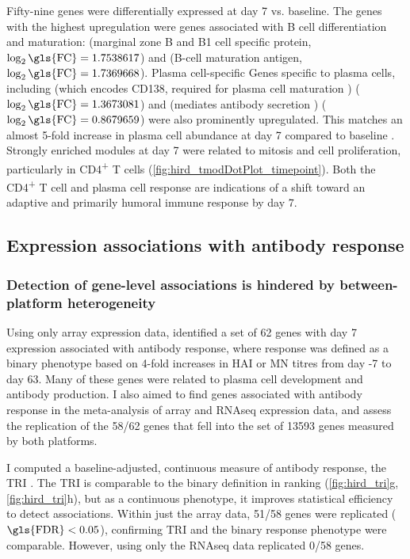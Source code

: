 Fifty-nine genes were differentially expressed at day 7 vs. baseline.
The genes with the highest upregulation were genes associated with B cell differentiation and maturation:  (marginal zone B and B1 cell specific protein, $\log_2\text{\gls{FC}} = 1.7538617$) and  (B-cell maturation antigen, $\log_2\text{\gls{FC}} = 1.7369668$).
Plasma cell-specific 
Genes specific to plasma cells, including  (which encodes CD138, required for plasma cell maturation \autocite{mccarron2017CD138MediatesSelection}) ($\log_2\text{\gls{FC}} = 1.3673081$) and  (mediates antibody secretion \autocite{martincic2009TranscriptionElongationFactor}) ($\log_2\text{\gls{FC}} = 0.8679659$) were also prominently upregulated.
This matches an almost 5-fold increase in plasma cell abundance at day 7 compared to baseline \autocite{sobolev2016AdjuvantedInfluenzaH1N1Vaccination}.
Strongly enriched modules at day 7 were related to mitosis and cell proliferation, particularly in CD4\textsuperscript{+} T cells (\cref{fig:hird_tmodDotPlot_timepoint}).
Both the CD4\textsuperscript{+} T cell and plasma cell response are indications of a shift toward an adaptive and primarily humoral immune response by day 7.

\subsection{Expression associations with antibody response}

\subsubsection{Detection of gene-level associations is hindered by between-platform heterogeneity}

Using only array expression data, \textcite{sobolev2016AdjuvantedInfluenzaH1N1Vaccination} identified a set of 62 genes with day 7 expression associated with antibody response, 
where response was defined as a binary phenotype based on 4-fold increases in \gls{HAI} or \gls{MN} titres from day -7 to day 63.
Many of these genes were related to plasma cell development and antibody production.
I also aimed to find genes associated with antibody response in the meta-analysis of array and \gls{RNAseq} expression data,
and assess the replication of the 58/62 genes that fell into the set of \num{13593} genes measured by both platforms.

I computed a baseline-adjusted, continuous measure of antibody response, the \gls{TRI} \autocite{bucasas2011EarlyPatternsGene}.
The \gls{TRI} is comparable to the binary definition in ranking (\cref{fig:hird_tri}g, \cref{fig:hird_tri}h), but as a continuous phenotype, it improves statistical efficiency to detect associations.
Within just the array data, 51/58 genes were replicated ($\text{\gls{FDR}} < 0.05$), 
confirming \gls{TRI} and the binary response phenotype were comparable.
However, using only the \gls{RNAseq} data replicated 0/58 genes.

